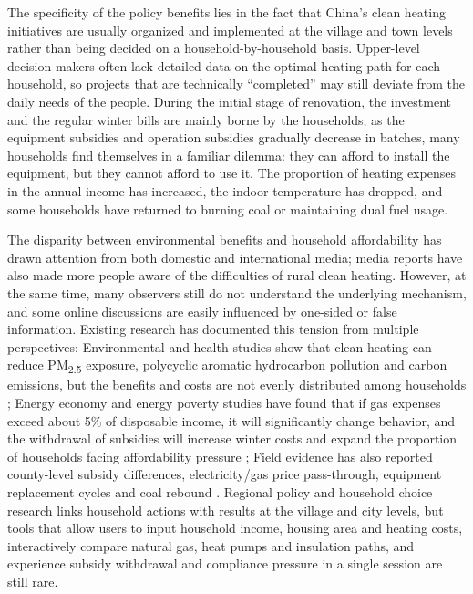 \documentclass[stu,12pt,floatsintext,donotrepeattitle]{apa7}
\begin{document}
The specificity of the policy benefits lies in the fact that China's clean heating initiatives are usually organized and implemented at the village and town levels rather than being decided on a household-by-household basis. Upper-level decision-makers often lack detailed data on the optimal heating path for each household, so projects that are technically ``completed'' may still deviate from the daily needs of the people. During the initial stage of renovation, the investment and the regular winter bills are mainly borne by the households; as the equipment subsidies and operation subsidies gradually decrease in batches, many households find themselves in a familiar dilemma: they can afford to install the equipment, but they cannot afford to use it. The proportion of heating expenses in the annual income has increased, the indoor temperature has dropped, and some households have returned to burning coal or maintaining dual fuel usage.

The disparity between environmental benefits and household affordability has drawn attention from both domestic and international media; media reports have also made more people aware of the difficulties of rural clean heating. However, at the same time, many observers still do not understand the underlying mechanism, and some online discussions are easily influenced by one-sided or false information. Existing research has documented this tension from multiple perspectives: Environmental and health studies show that clean heating can reduce PM\textsubscript{2.5} exposure, polycyclic aromatic hydrocarbon pollution and carbon emissions, but the benefits and costs are not evenly distributed among households \cite{liu2025pahs,yuan2025carbon,zhang2024uneven}; Energy economy and energy poverty studies have found that if gas expenses exceed about 5\% of disposable income, it will significantly change behavior, and the withdrawal of subsidies will increase winter costs and expand the proportion of households facing affordability pressure \cite{zhao2024sustainable,liu2020costs,zhai2023review}; Field evidence has also reported county-level subsidy differences, electricity/gas price pass-through, equipment replacement cycles and coal rebound \cite{hu2021decoalizing}. Regional policy and household choice research links household actions with results at the village and city levels, but tools that allow users to input household income, housing area and heating costs, interactively compare natural gas, heat pumps and insulation paths, and experience subsidy withdrawal and compliance pressure in a single session are still rare.
\end{document}

